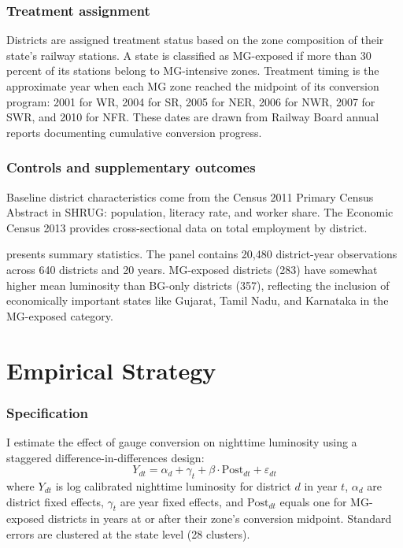 \documentclass[12pt]{article}
\begin{document}
\subsubsection*{Treatment assignment} Districts are assigned treatment status based on the zone composition of their state's railway stations. A state is classified as MG-exposed if more than 30 percent of its stations belong to MG-intensive zones. Treatment timing is the approximate year when each MG zone reached the midpoint of its conversion program: 2001 for WR, 2004 for SR, 2005 for NER, 2006 for NWR, 2007 for SWR, and 2010 for NFR. These dates are drawn from Railway Board annual reports documenting cumulative conversion progress.

\subsubsection*{Controls and supplementary outcomes} Baseline district characteristics come from the Census 2011 Primary Census Abstract in SHRUG: population, literacy rate, and worker share. The Economic Census 2013 provides cross-sectional data on total employment by district.



 presents summary statistics. The panel contains 20,480 district-year observations across 640 districts and 20 years. MG-exposed districts (283) have somewhat higher mean luminosity than BG-only districts (357), reflecting the inclusion of economically important states like Gujarat, Tamil Nadu, and Karnataka in the MG-exposed category.

\section{Empirical Strategy}
\label{sec:strategy}

\subsubsection*{Specification} I estimate the effect of gauge conversion on nighttime luminosity using a staggered difference-in-differences design:
\begin{equation}
\label{eq:main}
Y_{dt} = \alpha_d + \gamma_t + \beta \cdot \text{Post}_{dt} + \varepsilon_{dt}
\end{equation}
where $Y_{dt}$ is log calibrated nighttime luminosity for district $d$ in year $t$, $\alpha_d$ are district fixed effects, $\gamma_t$ are year fixed effects, and $\text{Post}_{dt}$ equals one for MG-exposed districts in years at or after their zone's conversion midpoint. Standard errors are clustered at the state level (28 clusters).
\end{document}
